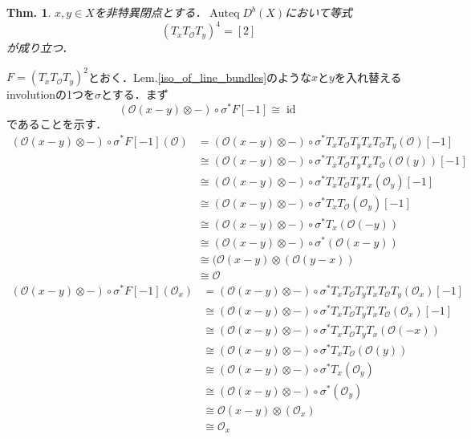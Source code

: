 \documentclass[uplatex,a4paper,11pt]{jsarticle}
\makeatletter
\theoremstyle{mystyle} %
\newtheorem{theorem}{Thm.}[section]
\renewenvironment{proof}[1][\proofname]{\par
 \pushQED{\qed}%
 \normalfont \topsep6\p@\@plus6\p@\relax
 \trivlist
 \item[\hskip\labelsep
 \itshape
 {\bf\underline{#1}}]\ignorespaces
}{%
 \popQED\endtrivlist\@endpefalse
}
\DeclareMathOperator{\Auteq}{Auteq}
\DeclareMathOperator{\id}{id}
\makeatother
\begin{document}
\begin{theorem}\label{G_2 relation for the III curve}
	$x, y \in X$を非特異閉点とする．$\Auteq D^b(X)$において等式$$(T_xT_\mathcal{O}T_y)^4=[2]$$が成り立つ．
\end{theorem}
\begin{proof}
	$F=(T_xT_\mathcal{O}T_y)^2$とおく．Lem.\ref{iso_of_line_bundles}のような$x$と$y$を入れ替えるinvolutionの1つを$\sigma$とする．まず$$(\mathcal{O}(x - y)\otimes - )\circ\sigma^* F[ - 1]\cong\id$$であることを示す．
	\begin{align}
		(\mathcal{O}(x - y)\otimes - )\circ\sigma^* F[ - 1](\mathcal{O})
		 & = (\mathcal{O}(x - y)\otimes - )\circ\sigma^*T_xT_\mathcal{O}T_yT_xT_\mathcal{O}T_y(\mathcal{O})[ - 1]     \\
		 & \cong (\mathcal{O}(x - y)\otimes - )\circ\sigma^*T_xT_\mathcal{O}T_yT_xT_\mathcal{O}(\mathcal{O}(y))[ - 1] \\
		 & \cong (\mathcal{O}(x - y)\otimes - )\circ\sigma^*T_xT_\mathcal{O}T_yT_x(\mathcal{O}_y)[ - 1]               \\
		 & \cong (\mathcal{O}(x - y)\otimes - )\circ\sigma^*T_xT_\mathcal{O}(\mathcal{O}_y)[ - 1]                     \\
		 & \cong (\mathcal{O}(x - y)\otimes - )\circ\sigma^*T_x(\mathcal{O}( - y))                                    \\
		 & \cong (\mathcal{O}(x - y)\otimes - )\circ\sigma^*(\mathcal{O}(x - y))                                      \\
		 & \cong (\mathcal{O}(x - y)\otimes(\mathcal{O}(y - x))                                                       \\
		 & \cong \mathcal{O}
	\end{align}
	\begin{align}
		(\mathcal{O}(x - y)\otimes - )\circ\sigma^* F[ - 1](\mathcal{O}_x)
		 & = (\mathcal{O}(x - y)\otimes - )\circ\sigma^*T_xT_\mathcal{O}T_yT_xT_\mathcal{O}T_y(\mathcal{O}_x)[ - 1]  \\
		 & \cong (\mathcal{O}(x - y)\otimes - )\circ\sigma^*T_xT_\mathcal{O}T_yT_xT_\mathcal{O}(\mathcal{O}_x)[ - 1] \\
		 & \cong (\mathcal{O}(x - y)\otimes - )\circ\sigma^*T_xT_\mathcal{O}T_yT_x(\mathcal{O}( - x))                \\
		 & \cong (\mathcal{O}(x - y)\otimes - )\circ\sigma^*T_xT_\mathcal{O}(\mathcal{O}(y))                         \\
		 & \cong (\mathcal{O}(x - y)\otimes - )\circ\sigma^*T_x(\mathcal{O}_y)                                       \\
		 & \cong (\mathcal{O}(x - y)\otimes - )\circ\sigma^*(\mathcal{O}_y)                                          \\
		 & \cong \mathcal{O}(x - y)\otimes(\mathcal{O}_x)                                                            \\
		 & \cong \mathcal{O}_x                                                                                       \\
	\end{align}


\end{proof}
\end{document}
